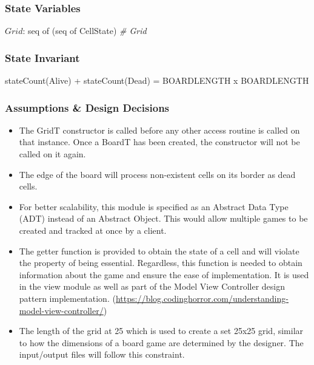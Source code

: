 \documentclass[12pt]{article}
\begin{document}
\subsubsection* {State Variables}

$Grid$: seq of (seq of CellState) \textit{\# Grid}\\


\subsubsection* {State Invariant}

stateCount(Alive) + stateCount(Dead) = BOARDLENGTH x BOARDLENGTH

\subsubsection* {Assumptions \& Design Decisions}

\begin{itemize}

\item The GridT constructor is called before any other access
  routine is called on that instance. Once a BoardT has been created, the
  constructor will not be called on it again.

\item The edge of the board will process non-existent cells on its border as dead cells.

\item For better scalability, this module is specified as an Abstract Data Type
  (ADT) instead of an Abstract Object. This would allow multiple games to be
  created and tracked at once by a client.

\item The getter function is provided to obtain the state of a cell and will violate the property of being essential. Regardless, this function is needed to obtain information about the game and ensure the ease of implementation. It is used in the view module as well as part of the Model View Controller design pattern implementation.
  (\url{https://blog.codinghorror.com/understanding-model-view-controller/})

\item The length of the grid at 25 which is used to create a set 25x25 grid, similar to how the dimensions of a board game are determined by the designer. The input/output files will follow this constraint. 

\end{itemize}
\end{document}
